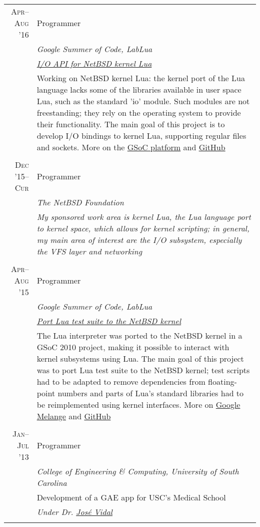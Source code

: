 \documentclass[a4paper,10pt]{article}
\begin{document}
\begin{longtable}{r|p{11cm}}

  \textsc{Apr--Aug '16} & Programmer \\
  &\emph{Google Summer of Code, LabLua}\\
  &\emph{\footnotesize{\href{https://goo.gl/g8Mb2M}{I/O API for NetBSD kernel Lua}}}\\
  &\footnotesize{Working on NetBSD kernel Lua: the kernel port of the Lua 
  language lacks some of the libraries available in user space Lua, such as
  the standard 'io' module. Such modules are not freestanding; they rely on
  the operating system to provide their functionality. The main goal of this
  project is to develop I/O bindings to kernel Lua, supporting regular files
  and sockets. More on the \href{https://goo.gl/g8Mb2M}{GSoC platform} and
  \href{https://GitHub.com/salazar/luaio}{GitHub}}
  \\\multicolumn{2}{c}{} \\

  \textsc{Dec '15--Cur}
  & Programmer \\
  &\emph{The NetBSD Foundation}\\
  &\emph{\footnotesize{My sponsored work area is kernel Lua, the Lua language
  port to kernel space, which allows for kernel scripting; in general, my main
  area of interest are the I/O subsystem, especially the VFS layer and networking}}
  \\\multicolumn{2}{c}{} \\
  
  \textsc{Apr--Aug '15}
  & Programmer \\
  &\emph{Google Summer of Code, LabLua}\\
  &\emph{\footnotesize{\href{https://goo.gl/xSl1bW}{Port Lua test
         suite to the NetBSD kernel}}}\\
  &\footnotesize{The Lua interpreter was ported to the NetBSD kernel in a GSoC 
   2010 project, making it possible to interact with kernel subsystems using
   Lua. The main goal of this project was to port Lua test suite to the NetBSD
   kernel; test scripts had to be adapted to remove dependencies from floating-
   point numbers and parts of Lua's standard libraries had to be reimplemented 
   using kernel interfaces. More on \href{https://goo.gl/xSl1bW}{Google Melange}
   and \href{https://GitHub.com/salazar/luatests}{GitHub}}
  \\\multicolumn{2}{c}{} \\

  \textsc{Jan--Jul '13}
  & Programmer \\
  &\emph{College of Engineering \& Computing, University of South Carolina}\\
  &\footnotesize{Development of a GAE app for USC's Medical School}\\
  &\emph{Under Dr. \href{http://jmvidal.cse.sc.edu}{José Vidal}}
  \\\multicolumn{2}{c}{} \\


\end{longtable}
\end{document}
